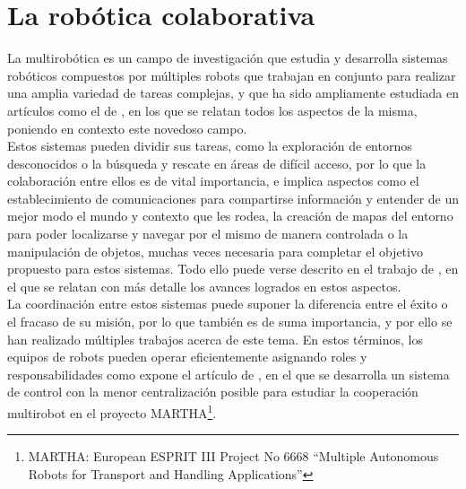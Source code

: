\section{La robótica colaborativa}
\label{sec:robotica_colaborativa} %


La multirobótica es un campo de investigación que estudia y desarrolla sistemas
robóticos compuestos por múltiples robots que trabajan en conjunto para realizar
una amplia variedad de tareas complejas, y que ha sido ampliamente estudiada en
artículos como el de \citet{Verma2021}, en los que se relatan todos los aspectos
de la misma, poniendo en contexto este novedoso campo.
\\

Estos sistemas pueden dividir sus tareas, como la exploración de entornos
desconocidos o la búsqueda y rescate en áreas de difícil acceso, por lo que la
colaboración entre ellos es de vital importancia, e implica aspectos como el
establecimiento de comunicaciones para compartirse información y entender de un
mejor modo el mundo y contexto que les rodea, la creación de mapas del entorno
para poder localizarse y navegar por el mismo de manera controlada o la
manipulación de objetos, muchas veces necesaria para completar el objetivo
propuesto para estos sistemas.
Todo ello puede verse descrito en el trabajo de \citet{Parker2003}, en el que se
relatan con más detalle los avances logrados en estos aspectos.
\\

La coordinación entre estos sistemas puede suponer la diferencia entre el éxito
o el fracaso de su misión, por lo que también es de suma importancia, y por ello
se han realizado múltiples trabajos acerca de este tema.
En estos términos, los equipos de robots pueden operar eficientemente asignando
roles y responsabilidades como expone el artículo de \cite{Alami1998}, en el
que se desarrolla un sistema de control con la menor centralización posible para
estudiar la cooperación multirobot en el proyecto
MARTHA\footnote{MARTHA: European ESPRIT III Project No 6668 ``Multiple
Autonomous Robots for Transport and Handling Applications''}.
\\

